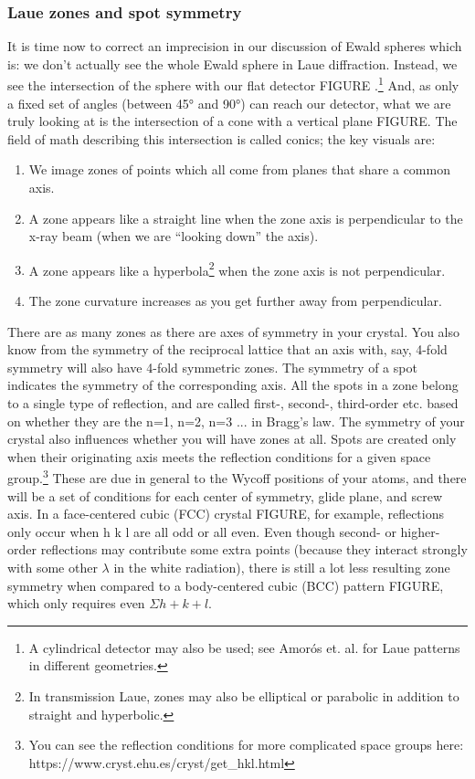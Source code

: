 \subsubsection{Laue zones and spot symmetry}
It is time now to correct an imprecision in our discussion of Ewald spheres which is: we don’t actually see the whole Ewald sphere in Laue diffraction. Instead, we see the intersection of the sphere with our flat detector FIGURE .\footnote{A cylindrical detector may also be used; see Amorós et. al. for Laue patterns in different geometries.} And, as only a fixed set of angles (between \ang{45} and \ang{90}) can reach our detector, what we are truly looking at is the intersection of a cone with a vertical plane FIGURE. The field of math describing this intersection is called conics; the key visuals are:
\begin{enumerate}
    \item We image zones of points which all come from planes that share a common axis.
    \item A zone appears like a straight line when the zone axis is perpendicular to the x-ray beam (when we are “looking down” the axis).
    \item A zone appears like a hyperbola\footnote{In transmission Laue, zones may also be elliptical or parabolic in addition to straight and hyperbolic.} when the zone axis is not perpendicular.
    \item The zone curvature increases as you get further away from perpendicular.
\end{enumerate}
There are as many zones as there are axes of symmetry in your crystal. You also know from the symmetry of the reciprocal lattice that an axis with, say, 4-fold symmetry will also have 4-fold symmetric zones. The symmetry of a spot indicates the symmetry of the corresponding axis. All the spots in a zone belong to a single type of reflection, and are called first-, second-, third-order etc. based on whether they are the n=1, n=2, n=3 ... in Bragg’s law.
The symmetry of your crystal also influences whether you will have zones at all. Spots are created only when their originating axis meets the reflection conditions for a given space group.\footnote{You can see the reflection conditions for more complicated space groups here: https://www.cryst.ehu.es/cryst/get_hkl.html } These are due in general to the Wycoff positions of your atoms, and there will be a set of conditions for each center of symmetry, glide plane, and screw axis. In a face-centered cubic (FCC) crystal FIGURE, for example, reflections only occur when h k l are all odd or all even. Even though second- or higher-order reflections may contribute some extra points (because they interact strongly with some other $\lambda$ in the white radiation), there is still a lot less resulting zone symmetry when compared to a body-centered cubic (BCC) pattern FIGURE, which only requires even $\Sigma h + k + l$.
